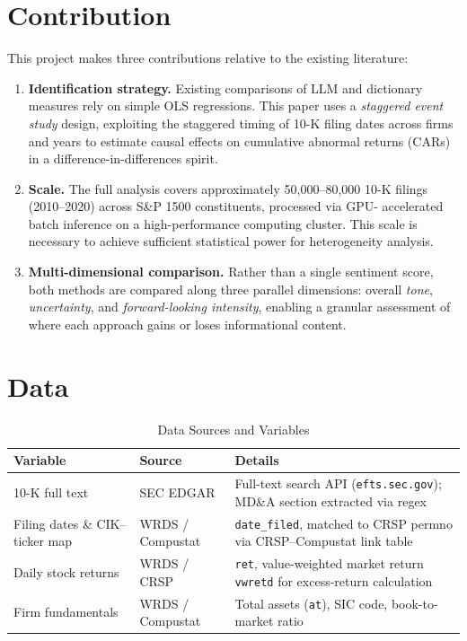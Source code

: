 \documentclass[12pt]{article}
\begin{document}
\section{Contribution}

This project makes three contributions relative to the existing literature:

\begin{enumerate}[leftmargin=1.5em, label=\textbf{\arabic*.}]
    \item \textbf{Identification strategy.} Existing comparisons of LLM and
    dictionary measures rely on simple OLS regressions. This paper uses a
    \emph{staggered event study} design, exploiting the staggered timing of
    10-K filing dates across firms and years to estimate causal effects on
    cumulative abnormal returns (CARs) in a difference-in-differences spirit.

    \item \textbf{Scale.} The full analysis covers approximately 50,000--80,000
    10-K filings (2010--2020) across S\&P 1500 constituents, processed via GPU-
    accelerated batch inference on a high-performance computing cluster. This
    scale is necessary to achieve sufficient statistical power for heterogeneity
    analysis.

    \item \textbf{Multi-dimensional comparison.} Rather than a single sentiment
    score, both methods are compared along three parallel dimensions: overall
    \emph{tone}, \emph{uncertainty}, and \emph{forward-looking intensity},
    enabling a granular assessment of where each approach gains or loses
    informational content.
\end{enumerate}

\section{Data}

\begin{table}[H]
\centering
\caption{Data Sources and Variables}
\renewcommand{\arraystretch}{1.35}
\begin{tabularx}{\textwidth}{l l X}
\toprule
\textbf{Variable} & \textbf{Source} & \textbf{Details} \\
\midrule
10-K full text & SEC EDGAR & Full-text search API
    (\texttt{efts.sec.gov}); MD\&A section extracted via regex \\
Filing dates \& CIK--ticker map & WRDS / Compustat & \texttt{date\_filed},
    matched to CRSP permno via CRSP--Compustat link table \\
Daily stock returns & WRDS / CRSP & \texttt{ret}, value-weighted market
    return \texttt{vwretd} for excess-return calculation \\
Firm fundamentals & WRDS / Compustat & Total assets (\texttt{at}), SIC code,
    book-to-market ratio \\
\bottomrule
\end{tabularx}
\end{table}
\end{document}
